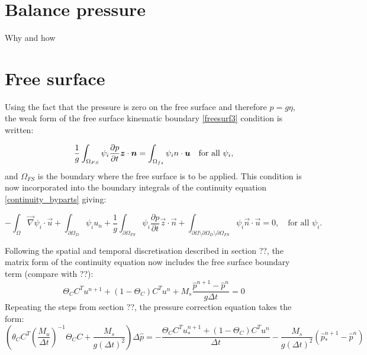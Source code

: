 \section{Balance pressure}
\label{Sect:balance_pressure}
Why and how

\section{Free surface}

Using the fact that the pressure is zero on the free surface and therefore $p=g\eta$, the weak form of the free surface kinematic boundary \eqref{freesurf3} condition is written:

\begin{equation}\label{weakfreesurf3}
\frac{1}{g} \int_{\Omega_{FS}} {\psi_i }\frac{\partial p}{\partial t}{\mbox{\boldmath$z$}} \cdot {\mbox{\boldmath$n$}}=\int_{\Omega_{fs}} \psi_i {n \cdot {\mbox{\boldmath${\mbox{\boldmath$u$}}$}}} \quad
  \text{for all } \psi_i,
\end{equation}
and $\Omega_{FS}$ is the boundary where the free surface is to be applied. This condition is now incorporated into the boundary integrals of the continuity equation \eqref{continuity_byparts} giving:

\begin{equation}\label{continuity_byparts_withfs}
  -\int_\Omega \vec\nabla\psi_i \cdot \vec u
  + \int_{\partial\Omega_D} \psi_i u_n
  + \frac{1}{g} \int_{\partial\Omega_{FS}}  {\psi_i }\frac{\partial p}{\partial t}\vec z \cdot \vec n
  + \int_{\partial\Omega\setminus\partial\Omega_D\setminus\partial\Omega_{FS}} \psi_i\vec n\cdot \vec u
  = 0,\quad
  \text{for all } \psi_i.
\end{equation}

Following the spatial and temporal discretisation described in section ??, the matrix form of the continuity equation now includes the free surface boundary term (compare with ??):
\begin{equation}
\Theta_C C^T u^{n+1} + (1-\Theta_C) C^T u^n + M_s \frac{\hat p^{n+1}-\hat p^n}{g \Delta t}=0
\end{equation}
Repeating the steps from section ??, the pressure correction equation takes the form:
\begin{equation}
(\theta_C C^T(\frac{M_u}{\Delta t})^{-1} \Theta_C C + \frac{M_s}{g(\Delta t)^2})\Delta \hat p = -\frac{\Theta_C C^T u_*^{n+1} + (1-\Theta_C)C^Tu^n}{\Delta t}-\frac{M_s}{g(\Delta t)^2}(\hat p_*^{n+1}-\hat p^n)
\end{equation}


